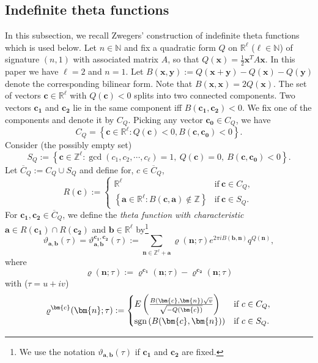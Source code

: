 \documentclass[12pt,reqno]{amsart}
\renewcommand{\t}{\tau}
\renewcommand{\(}{\left\(}
\renewcommand{\)}{\right\)}
\numberwithin{equation}{section}
\theoremstyle{plain}
\theoremstyle{definition}
\numberwithin{equation}{section}
\begin{document}
\subsection{Indefinite theta functions} In this subsection, we recall Zwegers' construction \cite{Zw} of indefinite theta functions which is used below. Let $n\in \mathbb{N}$ and fix a quadratic form $Q$ on $\mathbb{R}^{\ell}$ ($\ell\in \mathbb{N}$) of signature $(n,1)$ with associated matrix $A$, so that  $Q(\bm{x})=\frac 12\bm{x}^TA\bm{x}$. In this paper we have $\ell=2$ and $n=1$. Let $B(\bm{x},\bm{y}):=Q(\bm{x}+\bm{y})-Q(\bm{x})-Q(\bm{y})$ denote the corresponding bilinear form. Note that $B(\bm{x},\bm{x})=2Q(\bm{x})$. The set of vectors $\bm{c}\in \mathbb{R}^{\ell}$ with $Q(\bm{c})<0$ splits into two connected  components. Two vectors $\bm{c_1}$ and $\bm{c_2}$ lie in the same component iff $B(\bm{c_1},\bm{c_2})<0$. We fix one of the components and denote it by $C_{Q}$. Picking any vector $\bm{c_0}\in C_Q$, we have
\begin{equation}\label{CQ}
C_Q=\left\{\bm{c}\in \mathbb{R}^{\ell}:Q(\bm{c})<0, B\left(\bm{c},\bm{c_0}\right)<0\right\}.
\end{equation}
Consider (the possibly empty set)
\[
S_Q:=\left\{\bm{c}\in \mathbb{Z}^{\ell}:\gcd\left(c_1,c_2,\cdots,c_{\ell}\right)=1,\ Q(\bm{c})=0,\ B\left(\bm{c},\bm{c_0}\right)<0\right\}.
\]
Let $\overline{C}_Q:=C_Q\cup S_Q$ and define for, $c\in \overline{C}_Q$,
\[
R(\bm{c}):=\begin{cases}
\mathbb{R}^{\ell} &\text{if}\ \bm{c}\in C_Q,\\
\left\{\bm{a}\in \mathbb{R}^{\ell}:B\left(\bm{c},\bm{a}\right)\notin\mathbb{Z}\right\} &\text{if}\ \bm{c}\in S_Q.
\end{cases}
\]
For $\bm{c_1},\bm{c_2}\in \overline{C}_Q$, we define the {\it theta function with characteristic} $\bm{a}\in R(\bm{c_1})\cap R(\bm{c_2})$ and $\bm{b}\in \mathbb{R}^{\ell}$ by\footnote{We use the notation $\vartheta_{\bm{a},\bm{b}}(\t)$ if $\bm{c_1}$ and $\bm{c_2}$ are fixed.} 
\begin{equation}\label{theta}
\vartheta_{\bm{a},\bm{b}}(\t)=\vartheta^{\bm{c_1},\bm{c_2}}_{\bm{a},\bm{b}}(\t)
:=\sum_{\bm{n}\in \mathbb{Z}^{\ell}+\bm{a}}\varrho\left(\bm{n};\t\right)e^{2\pi iB\left(\bm{b},\bm{n}\right)}q^{Q(\bm{n})},
\end{equation}
where
\[
\varrho\left(\bm{n};\t\right):=\varrho^{\bm{c_1}}(\bm{n};\t)-\varrho^{\bm{c_2}}(\bm{n};\t)
\]
with ($\t=u+iv$)
\[
\varrho^{\bm{c}}(\bm{n};\t):=\begin{cases}
E\left(\frac{B\left(\bm{c},\bm{n}\right)\sqrt{v}}{\sqrt{-Q(\bm{c})}}\right) &\text{if}\ c\in C_Q,\\
\textnormal{sgn}\left(B(\bm{c},\bm{n})\right) &\text{if}\ c\in S_Q.
\end{cases}
\]
\end{document}
